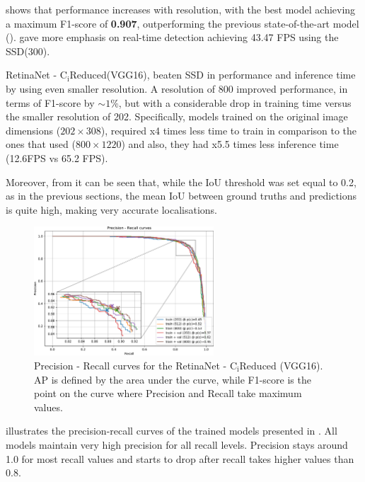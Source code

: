  shows that performance increases with resolution, with the best model achieving a maximum F1-score of \textbf{0.907}, outperforming the previous state-of-the-art model (\cite{bargoti2017deep}). \cite{liang2018apple} gave more emphasis on real-time detection achieving 43.47 FPS using the SSD(300).

RetinaNet - $\text{C}_\text{i}\text{Reduced}$(VGG16), beaten SSD in performance and inference time by using even smaller resolution. A resolution of 800 improved performance, in terms of F1-score by $\sim1\%$, but with a considerable drop in training time versus the smaller resolution of 202. Specifically, models trained on the original image dimensions ($202\times308$), required x4 times less time to train in comparison to the ones that used ($800\times1220$) and also, they had x5.5 times less inference time (12.6FPS vs 65.2 FPS).

Moreover, from  it can be seen that, while the IoU threshold was set equal to 0.2, as in the previous sections, the mean IoU between ground truths and predictions is quite high, making very accurate localisations.

\begin{figure}[!htb]
  \centering
  \includegraphics[width=0.6\textwidth]{figures/ch4/fig4.pdf}
  \caption{Precision - Recall curves for the RetinaNet - $\text{C}_\text{i}\text{Reduced}$ (VGG16). AP is defined by the area under the curve, while F1-score is the point on the curve where Precision and Recall take maximum values.}
  \label{fig4}
\end{figure} 

 illustrates the precision-recall curves of the trained models presented in . All models maintain very high precision for all recall levels. Precision stays around 1.0 for most recall values and starts to drop after recall takes higher values than 0.8.

